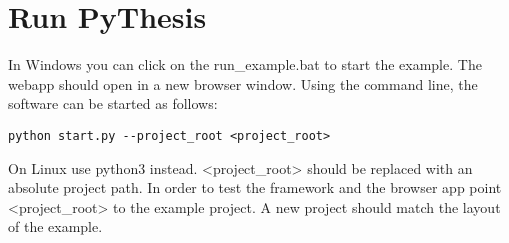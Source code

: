 \section{Run PyThesis}
In Windows you can click on the run\_example.bat to start the example. The webapp should open in a new browser window. Using the command line, the software can be started as follows: 
\begin{verbatim}
python start.py --project_root <project_root>
\end{verbatim}
On Linux use python3 instead. <project\_root> should be replaced with an absolute project path. In order to test the framework and the browser app point <project\_root> to the example project. A new project should match the layout of the example.


